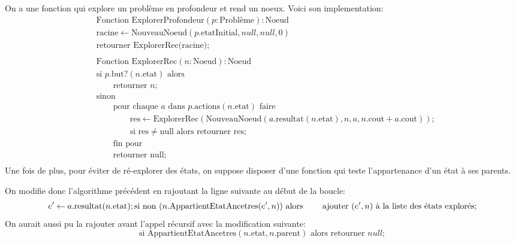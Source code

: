 {\begin{td-sol}[]
		On a une fonction qui explore un problème en 
		profondeur et rend un noeux. Voici son implementation:
		\begin{equation*}
			\begin{aligned}
				&\text{Fonction ExplorerProfondeur} (p: \text{Problème}): \text{Noeud} \\
				&\text{racine} \leftarrow \text{NouveauNoeud} (p.\text{etatInitial}, null, null, 0) \\
				&\text{retourner ExplorerRec(racine)}; %
				\\ \\
				&\text{Fonction ExplorerRec} (n: \text{Noeud}): \text{Noeud} \\
				&\text{si } p.\text{but}?(n.\text{etat}) \text{ alors }\\
				&\qquad \text{retourner } n; \\
				&\text{sinon} \\
				&\qquad \text{pour chaque } a \text{ dans } p.\text{actions}(n.\text{etat}) \text{ faire} \\
				&\qquad\qquad \text{res} \leftarrow \text{ExplorerRec}(\text{NouveauNoeud}(a.\text{resultat}(n.\text{etat}), n, a, n.\text{cout} + a.\text{cout})); \\
				&\qquad\qquad \text{si res} \neq \text{null alors retourner res}; \\
				&\qquad \text{fin pour} \\
				&\qquad \text{retourner null}; \\
			\end{aligned}
		\end{equation*}
		Une fois de plus, pour éviter de ré-explorer des états, on suppose disposer 
		d'une fonction qui teste l'appartenance d'un état à ses parents.

		On modifie donc l'algorithme précédent en rajoutant la ligne suivante
		au début de la boucle:
		\begin{equation*}
			e' \leftarrow a.\text{resultat}(n.\text{etat}); \\
			\text{si non } (n.\text{AppartientEtatAncetres}(e',n)) \text{ alors } \\
			\qquad \text{ajouter } (e',n) \text{ à la liste des états explorés};
		\end{equation*}
		On aurait aussi pu la rajouter avant l'appel récursif
		avec la modification suivante:
		\begin{equation*}
			\text{si AppartientEtatAncetres}(n.\text{etat}, n.\text{parent}) \text{ alors retourner }null;
		\end{equation*}


\end{td-sol}}
